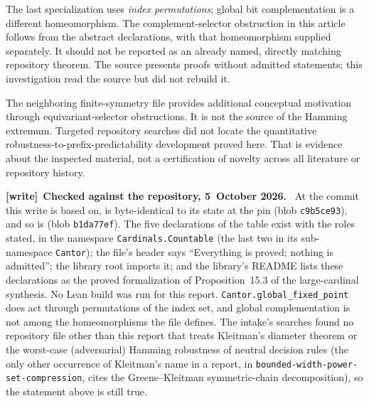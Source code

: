 \documentclass[11pt]{article}
\theoremstyle{definition}
\theoremstyle{remark}
\newcommand{\file}[1]{\nolinkurl{#1}}
\newenvironment{writenote}[1][]{\par\smallskip\begingroup\small
 \noindent\textbf{[write]}\if\relax\detokenize{#1}\relax\else~\textbf{#1.}\fi\ }%
 {\par\endgroup\smallskip}
\begin{document}
The last specialization uses \emph{index permutations}; global bit
complementation is a different homeomorphism. The complement-selector
obstruction in this article follows from the abstract declarations, with that
homeomorphism supplied separately. It should not be reported as an already
named, directly matching repository theorem. The source presents proofs without
admitted statements; this investigation read the source but did not rebuild it.

The neighboring finite-symmetry file
provides additional conceptual motivation through equivariant-selector
obstructions. It is not the source of the Hamming extremum. Targeted repository
searches did not locate the quantitative robustness-to-prefix-predictability
development proved here. That is evidence about the inspected material, not
a certification of novelty across all literature or repository history.

\begin{writenote}[Checked against the repository, 5~October 2026]
At the commit this write is based on,
 is byte-identical to its state at the pin
(blob \file{c9b5ce93}), and so is  (blob
\file{b1da77ef}). The five declarations of the table exist with the roles
stated, in the namespace \file{Cardinals.Countable} (the last two in its
sub-namespace \file{Cantor}); the file's header says ``Everything is proved;
nothing is admitted''; the library root
 imports it; and the library's
README lists these declarations as the proved formalization of
Proposition~15.3 of the large-cardinal synthesis. No Lean build was run for
this report. \file{Cantor.global_fixed_point} does act through permutations
of the index set, and global complementation is not among the
homeomorphisms the file defines. The intake's searches found no repository
file other than this report that treats Kleitman's diameter theorem or
the worst-case (adversarial) Hamming robustness of neutral decision rules
(the only other occurrence of Kleitman's name in a report, in
\file{bounded-width-power-set-compression}, cites the Greene--Kleitman
symmetric-chain decomposition), so the statement above is still true.
\end{writenote}
\end{document}
